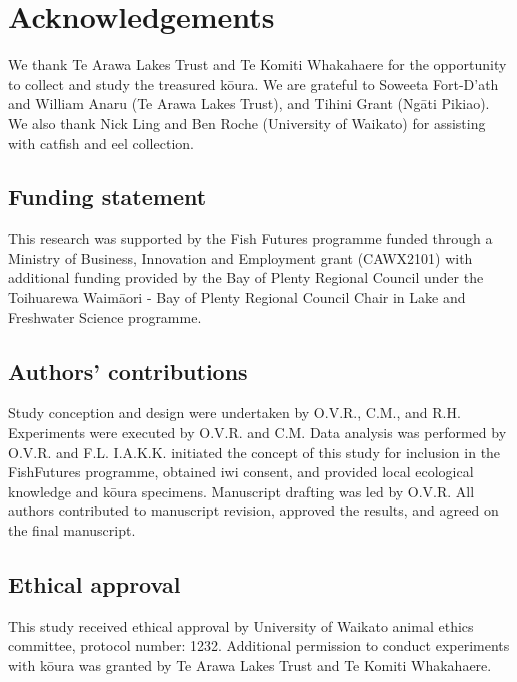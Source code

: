\documentclass[
  12pt,
  a4paper,
]{scrbook}
\begin{document}

\chapter{Acknowledgements}\label{acknowledgements}

We thank Te Arawa Lakes Trust and Te Komiti Whakahaere for the
opportunity to collect and study the treasured kōura. We are grateful to
Soweeta Fort-D'ath and William Anaru (Te Arawa Lakes Trust), and Tihini
Grant (Ngāti Pikiao). We also thank Nick Ling and Ben Roche (University
of Waikato) for assisting with catfish and eel collection.

\section{Funding statement}\label{funding-statement}

This research was supported by the Fish Futures programme funded through
a Ministry of Business, Innovation and Employment grant (CAWX2101) with
additional funding provided by the Bay of Plenty Regional Council under
the Toihuarewa Waimāori - Bay of Plenty Regional Council Chair in Lake
and Freshwater Science programme.

\section{Authors' contributions}\label{authors-contributions}

Study conception and design were undertaken by O.V.R., C.M., and R.H.
Experiments were executed by O.V.R. and C.M. Data analysis was performed
by O.V.R. and F.L. I.A.K.K. initiated the concept of this study for
inclusion in the FishFutures programme, obtained iwi consent, and
provided local ecological knowledge and kōura specimens. Manuscript
drafting was led by O.V.R. All authors contributed to manuscript
revision, approved the results, and agreed on the final manuscript.

\section{Ethical approval}\label{ethical-approval}

This study received ethical approval by University of Waikato animal
ethics committee, protocol number: 1232. Additional permission to
conduct experiments with kōura was granted by Te Arawa Lakes Trust and
Te Komiti Whakahaere.
\end{document}
